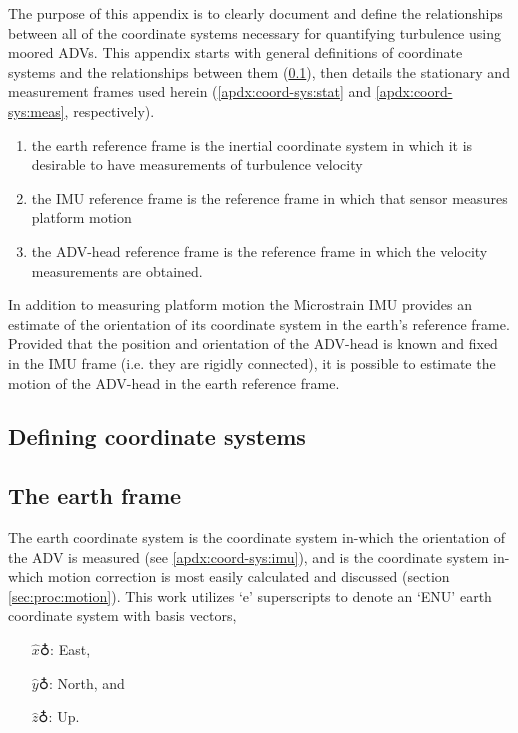\documentclass[twocol]{ametsoc}
\begin{document}
The purpose of this appendix is to clearly document and define the relationships between all of the coordinate systems necessary for quantifying turbulence using moored ADVs.  This appendix starts with general definitions of coordinate systems and the relationships between them (\ref{apdx:coord-sys:math}), then details the stationary and measurement frames used herein (\ref{apdx:coord-sys:stat} and \ref{apdx:coord-sys:meas}, respectively).

\begin{enumerate}
\item the earth reference frame is the inertial coordinate system in
which it is desirable to have measurements of turbulence velocity
\item the IMU reference frame is the reference frame in which that
sensor measures platform motion
\item the ADV-head reference frame is the reference frame in which the
velocity measurements are obtained.
\end{enumerate}

In addition to measuring platform motion the Microstrain IMU provides
an estimate of the orientation of its coordinate system in the earth's
reference frame. Provided that the position and orientation of the
ADV-head is known and fixed in the IMU frame (i.e. they are rigidly
connected), it is possible to estimate the motion of the ADV-head in
the earth reference frame.




\subsection{Defining coordinate systems}\label{apdx:coord-sys:math}


\subsection{The earth frame}
The earth coordinate system is the coordinate system in-which the orientation of the ADV is measured (see \ref{apdx:coord-sys:imu}), and is the coordinate system in-which motion correction is most easily calculated and discussed (section \ref{sec:proc:motion}).  This work utilizes `e' superscripts to denote an `ENU' earth coordinate system with basis vectors,
\begin{itemize}
\item[$\hat{x}\earth$:] East,
\item[$\hat{y}\earth$:] North, and
\item[$\hat{z}\earth$:] Up.
\end{itemize}
\end{document}
